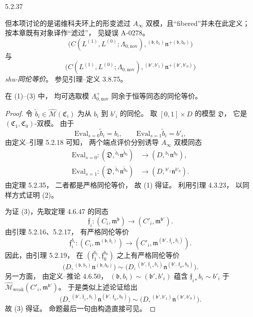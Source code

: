 \begin{proposition}{5.2.37}
\begin{enumerate}[label=\textup{(\arabic*)},leftmargin=2.8em]
{但本项讨论的是诺维科夫环上的形变滤过
$A_\infty$ 双模，且“fibered”并未在此定义；
按本章既有对象译作“滤过”，
见疑误 A-0278。}
\[
\bigl(C(L^{(1)},L^{(0)};\Lambda_{0,\mathrm{nov}}),
{}^{(\mathfrak b,b_1)}
\mathfrak n^{+(\mathfrak b,b_0)}\bigr)
\]
与
\[
\bigl(C(L^{(1)},L^{(0)};\Lambda_{0,\mathrm{nov}}),
{}^{(\mathfrak b',b'_1)}
\mathfrak n^{+(\mathfrak b',b'_0)}\bigr)
\]
\emph{shu-同伦等价}。
参见引理--定义 3.8.75。
\end{enumerate}
在 (1)--(3) 中，
均可选取模 $\Lambda^+_{0,\mathrm{nov}}$
同余于恒等同态的同伦等价。
\end{proposition}

\begin{proof}
令
$\widetilde b_i
\in\widehat{\mathcal M}(\mathfrak C_i)$
为从 $b_i$ 到 $b'_i$ 的同伦。
取 $[0,1]\times D$ 的模型
$\mathfrak D$，
它是
$(\mathfrak C_1,\mathfrak C_0)$-双模。
由于
\[
\mathrm{Eval}_{s=0}\widetilde b_i=b_i,
\qquad
\mathrm{Eval}_{s=1}\widetilde b_i=b'_i,
\]
由定义--引理 5.2.18 可知，
两个端点评价分别诱导
$A_\infty$ 双模同态
\[
\begin{aligned}
\mathrm{Eval}_{s=0}:
(\mathfrak D,
{}^{\widetilde b_1}\mathfrak n^{\widetilde b_0})
&\longrightarrow
(D,{}^{b_1}\mathfrak n^{b_0}),\\
\mathrm{Eval}_{s=1}:
(\mathfrak D,
{}^{\widetilde b_1}\mathfrak n^{\widetilde b_0})
&\longrightarrow
(D,{}^{b'_1}\mathfrak n^{b'_0}).
\end{aligned}
\]
由定理 5.2.35，
二者都是严格同伦等价，
故 (1) 得证。
利用引理 4.3.23，
以同样方式证明 (2)。

为证 (3)，先取定理 4.6.47 的同态
\[
\mathfrak f_i:
(C_i,\mathfrak m^{\mathfrak b})
\longrightarrow
(C'_i,\mathfrak m^{\mathfrak b'}).
\]
由引理 5.2.16、5.2.17，
有严格同伦等价
\[
\mathfrak f_i^{b_i}:
(C_i,\mathfrak m^{(\mathfrak b,b_i)})
\longrightarrow
(C'_i,\mathfrak m^{
(\mathfrak b',\,\mathfrak f_{i*}b_i)}).
\]
因此，由引理 5.2.19，
在
$(\mathfrak f_1^{b_1},\mathfrak f_0^{b_0})$
之上有严格同伦等价
\[
\bigl(D,
{}^{(\mathfrak b,b_1)}
\mathfrak n^{(\mathfrak b,b_0)}\bigr)
\sim
\bigl(D,
{}^{(\mathfrak b',\,\mathfrak f_{1*}b_1)}
\mathfrak n^{
(\mathfrak b',\,\mathfrak f_{0*}b_0)}\bigr).
\]
另一方面，
由定义--推论 4.6.50，
$(\mathfrak b,b_i)\sim
(\mathfrak b',b'_i)$
蕴含
$\mathfrak f_{i*}b_i\sim b'_i$
于
$\widehat{\mathcal M}_{\mathrm{weak}}
(C'_i,\mathfrak m^{\mathfrak b'})$。
于是类似上述论证给出
\[
\bigl(D,
{}^{(\mathfrak b',\,\mathfrak f_{1*}b_1)}
\mathfrak n^{
(\mathfrak b',\,\mathfrak f_{0*}b_0)}\bigr)
\sim
\bigl(D,
{}^{(\mathfrak b',b'_1)}
\mathfrak n^{(\mathfrak b',b'_0)}\bigr).
\]
故 (3) 得证。
命题最后一句由构造直接可见。
\end{proof}

